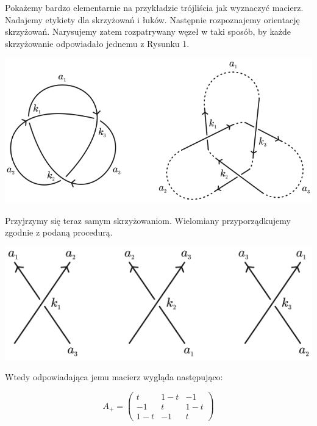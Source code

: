 \begin{przyklad}
   Pokażemy bardzo elementarnie na przykładzie trójliścia jak wyznaczyć macierz.
   Nadajemy etykiety dla skrzyżowań i łuków. Następnie rozpoznajemy orientację skrzyżowań. Narysujemy zatem rozpatrywany węzeł w taki sposób,
   by każde skrzyżowanie odpowiadało jednemu z Rysunku 1.

   \begin{center}
      \includegraphics[scale=0.5]{3/images/3}
   \end{center}

   Przyjrzymy się teraz samym skrzyżowaniom. Wielomiany przyporządkujemy zgodnie z podaną procedurą.
   
   \begin{center}
      \includegraphics[scale=0.5]{3/images/4}
   \end{center}

   Wtedy odpowiadająca jemu macierz wygląda następująco:
   
   $$
   A_+ = 
   \left( \begin{array}{ccc}
   t & 1-t & -1 \\
   -1 & t & 1-t \\
   1-t & -1 & t
   \end{array} \right)
   $$ 
\end{przyklad}





